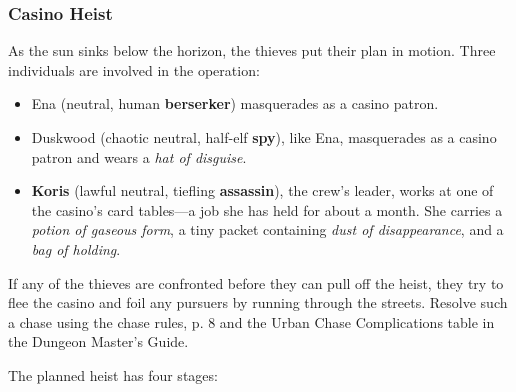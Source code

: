 \documentclass[a4paper, 11pt, bg=full, twocolumn, nooutline]{dndbook}
\begin{document}
\subsubsection{Casino Heist}

As the sun sinks below the horizon, the thieves put their plan in motion. Three individuals are involved in the operation:

\begin{itemize}
\item Ena (neutral, human \textbf{berserker}) masquerades as a casino patron.
\item Duskwood (chaotic neutral, half-elf \textbf{spy}), like Ena, masquerades as a casino patron and wears a \textit{hat of disguise}.
\item \textbf{Koris} (lawful neutral, tiefling \textbf{assassin}), the crew's leader, works at one of the casino's card tables---a job she has held for about a month. She carries a \textit{potion of gaseous form}, a tiny packet containing \textit{dust of disappearance}, and a \textit{bag of holding}.
\end{itemize}

If any of the thieves are confronted before they can pull off the heist, they try to flee the casino and foil any pursuers by running through the streets. Resolve such a chase using the chase rules, p. 8 and the Urban Chase Complications table in the Dungeon Master's Guide.

The planned heist has four stages:
\end{document}
